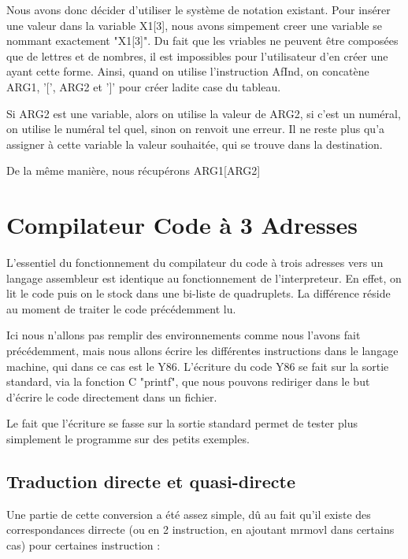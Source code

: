 \documentclass{article}
\begin{document}
Nous avons donc décider d'utiliser le système de notation existant. Pour insérer une valeur dans la variable X1[3], nous avons simpement creer une variable se nommant exactement "X1[3]".
Du fait que les vriables ne peuvent être composées que de lettres et de nombres, il est impossibles pour l'utilisateur d'en créer une ayant cette forme.
Ainsi, quand on utilise l'instruction AfInd, on concatène ARG1, '[', ARG2 et ']' pour créer ladite case du tableau.

Si ARG2 est une variable, alors on utilise la valeur de ARG2, si c'est un numéral, on utilise le numéral tel quel, sinon on renvoit une erreur.
Il ne reste plus qu'a assigner à cette variable la valeur souhaitée, qui se trouve dans la destination.

De la même manière, nous récupérons ARG1[ARG2]

\newpage
\section{Compilateur Code à 3 Adresses}

L'essentiel du fonctionnement du compilateur du code à trois adresses vers un langage assembleur est identique au fonctionnement de l'interpreteur.
En effet, on lit le code puis on le stock dans une bi-liste de quadruplets. La différence réside au moment de traiter le code précédemment lu.

Ici nous n'allons pas remplir des environnements comme nous l'avons fait précédemment, mais nous allons écrire les différentes instructions dans le langage machine, qui dans ce cas est le Y86.
L'écriture du code Y86 se fait sur la sortie standard, via la fonction C "printf", que nous pouvons rediriger dans le but d'écrire le code directement dans un fichier.

Le fait que l'écriture se fasse sur la sortie standard permet de tester plus simplement le programme sur des petits exemples.


\subsection{Traduction directe et quasi-directe}


Une partie de cette conversion a été assez simple, dû au fait qu'il existe des correspondances dirrecte (ou en 2 instruction, en ajoutant mrmovl dans certains cas) pour certaines instruction :
\end{document}
